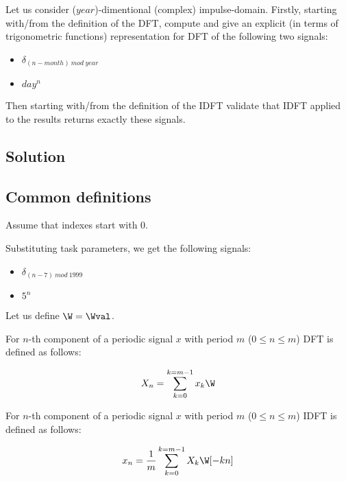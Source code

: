\documentclass[a4paper]{article}
\theoremstyle{break}
\theoremstyle{break}
\begin{document}
Let us consider ($year$)-dimentional (complex) impulse-domain. Firstly, starting with/from the definition of the DFT, compute and give an explicit (in terms of trigonometric functions) representation for DFT of the following two signals:

\begin{itemize}
  \item $\delta_{(n - month)\ mod\ year}$
  \item $day^n$
\end{itemize}

Then starting with/from the definition of the IDFT validate that IDFT applied to the results returns exactly these signals.

\subsection*{Solution}

\subsection{Common definitions}

Assume that indexes start with 0.

Substituting task parameters, we get the following signals:

\begin{itemize}
  \item $\delta_{(n - 7)\ mod\ 1999}$
  \item $5^n$
\end{itemize}

Let us define $\W = \Wval$.

For $n$-th component of a periodic signal $x$ with period $m$ ($0 \leq n \leq m$) DFT is defined as follows:

\begin{equation} \label{eqn:dft}
  \begin{split}
    X_n = \sum_{k = 0}^{k = m - 1} x_k \W
  \end{split}
\end{equation}

For $n$-th component of a periodic signal $x$ with period $m$ ($0 \leq n \leq m$) IDFT is defined as follows:

\begin{equation} \label{eqn:idft}
  \begin{split}
    x_n = \frac{1}{m} \sum_{k = 0}^{k = m - 1} X_k \W[-kn]
  \end{split}
\end{equation}
\end{document}
